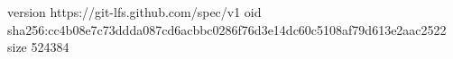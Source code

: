version https://git-lfs.github.com/spec/v1
oid sha256:cc4b08e7c73ddda087cd6acbbc0286f76d3e14dc60c5108af79d613e2aac2522
size 524384
